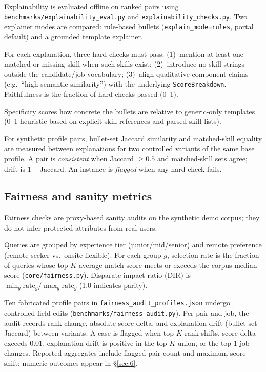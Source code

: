 Explainability is evaluated offline on ranked pairs using \texttt{benchmarks/explainability\_eval.py} and \texttt{explainability\_checks.py}.
Two explainer modes are compared: rule-based bullets (\texttt{explain\_mode=rules}, portal default) and a grounded template explainer.

For each explanation, three hard checks must pass: (1)~mention at least one matched or missing skill when such skills exist; (2)~introduce no skill strings outside the candidate/job vocabulary; (3)~align qualitative component claims (e.g.\ ``high semantic similarity'') with the underlying \texttt{ScoreBreakdown}.
Faithfulness is the fraction of hard checks passed (0--1).

Specificity scores how concrete the bullets are relative to generic-only templates (0--1 heuristic based on explicit skill references and parsed skill lists).

For synthetic profile pairs, bullet-set Jaccard similarity and matched-skill equality are measured between explanations for two controlled variants of the same base profile.
A pair is \emph{consistent} when Jaccard $\geq 0.5$ and matched-skill sets agree; drift is $1 - \text{Jaccard}$.
An instance is \emph{flagged} when any hard check fails.


\subsection{Fairness and sanity metrics}\label{sec:5-fairness}

Fairness checks are proxy-based sanity audits on the synthetic demo corpus; they do not infer protected attributes from real users.

Queries are grouped by experience tier (junior/mid/senior) and remote preference (remote-seeker vs.\ onsite-flexible).
For each group $g$, selection rate is the fraction of queries whose top-$K$ average match score meets or exceeds the corpus median score (\texttt{core/fairness.py}).
Disparate impact ratio (DIR) is $\min_g \mathrm{rate}_g / \max_g \mathrm{rate}_g$ (1.0 indicates parity).

Ten fabricated profile pairs in \texttt{fairness\_audit\_profiles.json} undergo controlled field edits (\texttt{benchmarks/fairness\_audit.py}).
Per pair and job, the audit records rank change, absolute score delta, and explanation drift (bullet-set Jaccard) between variants.
A case is flagged when top-$K$ rank shifts, score delta exceeds $0.01$, explanation drift is positive in the top-$K$ union, or the top-1 job changes.
Reported aggregates include flagged-pair count and maximum score shift; numeric outcomes appear in \S\ref{sec:6}.
